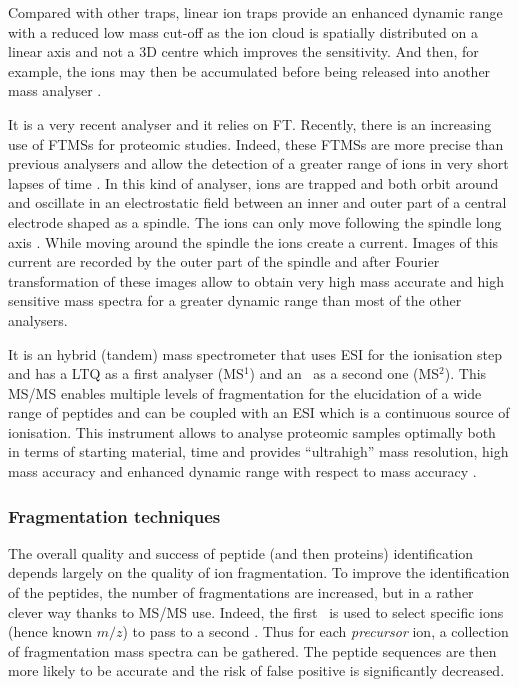Compared with other traps, linear ion traps provide an enhanced dynamic range
with a reduced low mass cut-off as the ion cloud is
spatially distributed on a linear axis and not a 3D centre which improves the
sensitivity. And then, for example, the ions may then be accumulated before
being released into another mass analyser .

\minisec{\orbi}
It is a very recent analyser and it relies on \gls{FT}. Recently,
there is an increasing use of \glspl{FTMS} for proteomic studies. Indeed, these
\glspl{FTMS} are more precise than previous analysers and allow the detection of
a greater range of ions in very short lapses of time .
In this kind of analyser, ions are trapped and both orbit around and oscillate
in an electrostatic field between an inner and outer part of a central electrode
shaped as a spindle. The ions can only move following the spindle long axis
. While moving around the spindle the ions create a current.
Images of this current are recorded by the outer part of the spindle and after
Fourier transformation of these images allow to obtain very high mass accurate
and high sensitive mass spectra for a greater dynamic range than most of the
other analysers. 

It is an hybrid (tandem) mass spectrometer that uses \gls{ESI} for the ionisation
step and has a \gls{LTQ} as a first analyser (MS$^1$)
and an \orbi\ as a second one (MS$^2$).
This \gls{MS/MS} enables multiple levels of
fragmentation for the elucidation of a wide range of peptides and can be coupled
with an \gls{ESI} which is a continuous source of ionisation. This instrument
allows to analyse proteomic samples optimally both in terms of starting material,
time  and provides \enquote{ultrahigh} mass resolution,
high mass accuracy and enhanced dynamic range with respect to mass accuracy
.

\subsubsection{Fragmentation techniques }

The overall quality and success of peptide (and then proteins)
identification depends largely on the quality of ion fragmentation. To improve
the identification of the peptides, the number of fragmentations are increased,
but in a rather clever way thanks to \gls{MS/MS} use. Indeed, the first \ms\ is
used to select specific ions (hence known $m/z$) to pass to a second \ms.
Thus for each \emph{precursor} ion, a collection of fragmentation mass spectra
can be gathered. The peptide sequences are then more likely to be accurate and
the risk of false positive is significantly decreased.

